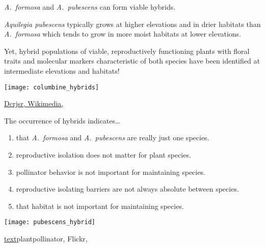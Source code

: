 \documentclass[t,hidelinks]{beamer}
\newcommand{\ques}[1]{\highlight{\textsc{q#1:}}}
\begin{document}
\begin{frame}[t]{\textit{A.~formosa} and \textit{A.~pubescens} can form viable hybrids.}
	
	\vspace*{-\baselineskip}
	
	\begin{multicols}{2}
	\hangpara \textit{Aquilegia pubescens} typically grows at higher elevations and in drier habitats than \textit{A.~formosa} which tends to grow in more moist habitats at lower elevations.

	\hangpara Yet, hybrid populations of viable, reproductively functioning plants with floral traits and molecular markers characteristic of both species have been identified at intermediate elevations and habitats!

	\hangpara {}

	\columnbreak
	
		{\centering
		\texttt{[image: columbine\_hybrids]}\par}
	\end{multicols}
	
	\vfilll
	
	\hfill \tiny \href{https://commons.wikimedia.org/wiki/File:Aquilegia_pubescens-formosa_hybrid-swarm_flowers_close.jpg}{Dcrjsr, Wikimedia, }
\end{frame}
%
\begin{frame}[t]{\ques{16} The occurrence of hybrids indicates\dots}
	
	\begin{multicols}{2}
	\begin{enumerate}
		\item that \textit{A.~formosa} and \textit{A.~pubescens} are really just one species.
		\item reproductive isolation does not matter for plant species.
		\item pollinator behavior is not important for maintaining species.
		\item reproductive isolating barriers are not always absolute between species.
		\item that habitat is not important for maintaining species.
	\end{enumerate}
	
	\columnbreak
	
		\texttt{[image: pubescens\_hybrid]}
	\end{multicols}
	
	\vfilll
	
	\hfill \tiny \href{https://www.flickr.com/photos/63093099@N02/32184751505/in/photolist-R34gjH}{text}plantpollinator, Flickr, 
\end{frame}
\end{document}
